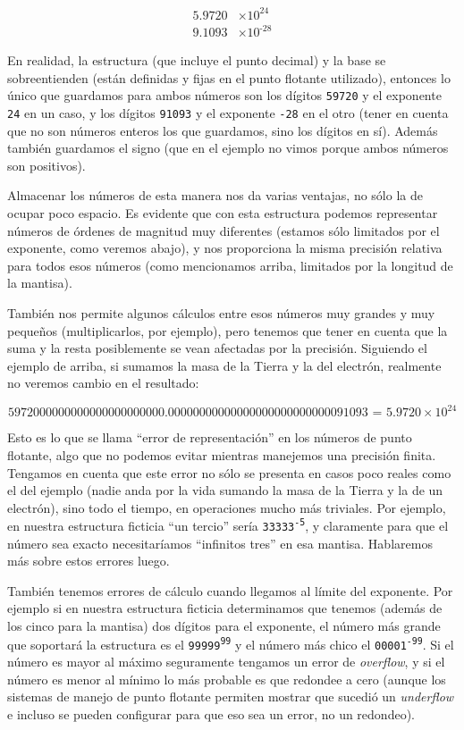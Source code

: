 \begin{align*}
\text{5.9720} &\times 10^{\text{24}}\\
\text{9.1093} &\times 10^{\text{-28}}
\end{align*}

En realidad, la estructura (que incluye el punto decimal) y la base se sobreentienden (están definidas y fijas en el punto flotante utilizado), entonces lo único que guardamos para ambos números son los dígitos \texttt{59720} y el exponente \texttt{24} en un caso, y los dígitos \texttt{91093} y el exponente \texttt{-28} en el otro (tener en cuenta que no son números enteros los que guardamos, sino los dígitos en sí). Además también guardamos el signo (que en el ejemplo no vimos porque ambos números son positivos).

Almacenar los números de esta manera nos da varias ventajas, no sólo la de ocupar poco espacio. Es evidente que con esta estructura podemos representar números de órdenes de magnitud muy diferentes (estamos sólo limitados por el exponente, como veremos abajo), y nos proporciona la misma precisión relativa para todos esos números (como mencionamos arriba, limitados por la longitud de la mantisa).

También nos permite algunos cálculos entre esos números muy grandes y muy pequeños (multiplicarlos, por ejemplo), pero tenemos que tener en cuenta que la suma y la resta posiblemente se vean afectadas por la precisión. Siguiendo el ejemplo de arriba, si sumamos la masa de la Tierra y la del electrón, realmente no veremos cambio en el resultado:

\begin{equation*}
\text{5972000000000000000000000.00000000000000000000000000091093 = 5.9720} \times 10^{\text{24}}
\end{equation*}

Esto es lo que se llama ``error de representación'' en los números de punto flotante, algo que no podemos evitar mientras manejemos una precisión finita. Tengamos en cuenta que este error no sólo se presenta en casos poco reales como el del ejemplo (nadie anda por la vida sumando la masa de la Tierra y la de un electrón), sino todo el tiempo, en operaciones mucho más triviales. Por ejemplo, en nuestra estructura ficticia ``un tercio'' sería \texttt{33333\textsuperscript{-5}}, y claramente para que el número sea exacto necesitaríamos ``infinitos tres'' en esa mantisa. Hablaremos más sobre estos errores luego.

También tenemos errores de cálculo cuando llegamos al límite del exponente. Por ejemplo si en nuestra estructura ficticia determinamos que tenemos (además de los cinco para la mantisa) dos dígitos para el exponente, el número más grande que soportará la estructura es el \texttt{99999\textsuperscript{99}} y el número más chico el \texttt{00001\textsuperscript{-99}}. Si el número es mayor al máximo seguramente tengamos un error de \emph{overflow}, y si el número es menor al mínimo lo más probable es que redondee a cero (aunque los sistemas de manejo de punto flotante permiten mostrar que sucedió un \emph{underflow} e incluso se pueden configurar para que eso sea un error, no un redondeo).

